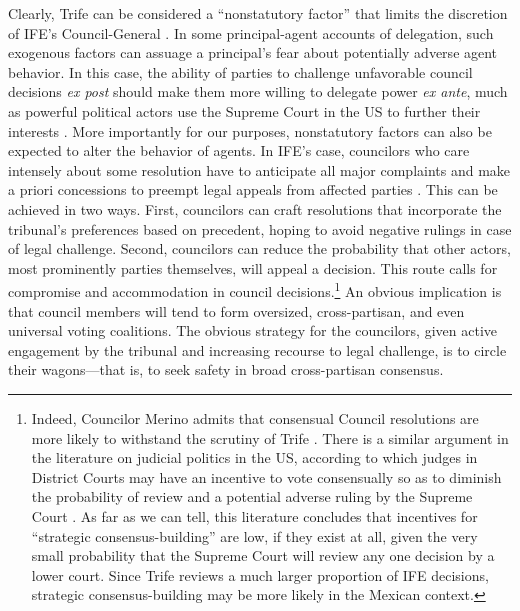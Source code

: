 \documentclass[12 pt, letter]{article}
\begin{document}
Clearly, {\sc Trife} can be considered a ``nonstatutory factor'' that limits the discretion of IFE's Council-General \citep{Huber2002}. In some principal-agent accounts of delegation, such exogenous factors can assuage a principal's fear about potentially adverse agent behavior.  In this case, the ability of parties to challenge unfavorable council decisions \emph{ex post} should make them more willing to delegate power \emph{ex ante}, much as powerful political actors use the Supreme Court in the US to further their interests \citep{Clayton2002, Mcnollgast1999}. More importantly for our purposes, nonstatutory factors can also be expected to alter the behavior of agents.  In IFE's case, councilors who care intensely about some resolution have to anticipate all major complaints and make a priori concessions to preempt legal appeals from affected parties \citep[cf.][]{GelySpiller1990}. This can be achieved in two ways. First, councilors can craft resolutions that incorporate the tribunal's preferences based on precedent, hoping to avoid negative rulings in case of legal challenge. Second, councilors can reduce the probability that other actors, most prominently parties themselves, will appeal a decision. This route calls for compromise and accommodation in council decisions.\footnote{Indeed, Councilor Merino admits that consensual Council resolutions are more likely to withstand the scrutiny of {\sc Trife}  \citep{Merino1999}.  There is a similar argument in the literature on judicial politics in the US, according to which judges in District Courts may have an incentive to vote consensually so as to diminish the probability of review and a potential adverse ruling by the Supreme Court \citep{Cameron2000, Lax2003, Songer1994}.  As far as we can tell, this literature concludes that incentives for ``strategic consensus-building'' are low, if they exist at all, given the very small probability that the Supreme Court will review any one decision by a lower court.  Since {\sc Trife} reviews a much larger proportion of IFE decisions, strategic consensus-building may be more likely in the Mexican context.} An obvious implication is that council members will tend to form oversized, cross-partisan, and even universal voting coalitions. The obvious strategy for the councilors, given active engagement by the tribunal and increasing recourse to legal challenge, is to circle their wagons---that is, to seek safety in broad cross-partisan consensus.
\end{document}
